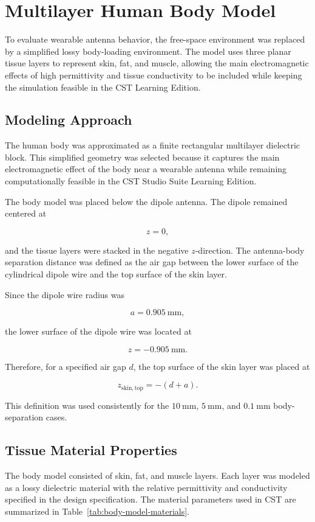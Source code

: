 \section{Multilayer Human Body Model}

To evaluate wearable antenna behavior, the free-space environment was replaced by a simplified lossy body-loading environment. The model uses three planar tissue layers to represent skin, fat, and muscle, allowing the main electromagnetic effects of high permittivity and tissue conductivity to be included while keeping the simulation feasible in the CST Learning Edition.

\subsection{Modeling Approach}

The human body was approximated as a finite rectangular multilayer dielectric block. This simplified geometry was selected because it captures the main electromagnetic effect of the body near a wearable antenna while remaining computationally feasible in the CST Studio Suite Learning Edition.

The body model was placed below the dipole antenna. The dipole remained centered at

\[
z=0,
\]

and the tissue layers were stacked in the negative \(z\)-direction. The antenna-body separation distance was defined as the air gap between the lower surface of the cylindrical dipole wire and the top surface of the skin layer.

Since the dipole wire radius was

\[
a = 0.905~\mathrm{mm},
\]

the lower surface of the dipole wire was located at

\[
z = -0.905~\mathrm{mm}.
\]

Therefore, for a specified air gap \(d\), the top surface of the skin layer was placed at

\[
z_{\mathrm{skin,top}} = -(d+a).
\]

This definition was used consistently for the \(10~\mathrm{mm}\), \(5~\mathrm{mm}\), and \(0.1~\mathrm{mm}\) body-separation cases.

\subsection{Tissue Material Properties}

The body model consisted of skin, fat, and muscle layers. Each layer was modeled as a lossy dielectric material with the relative permittivity and conductivity specified in the design specification. The material parameters used in CST are summarized in Table~\ref{tab:body-model-materials}.

